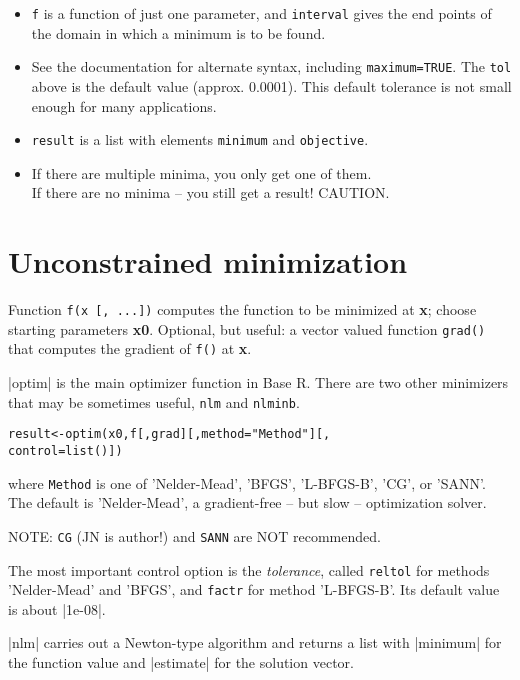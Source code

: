 \documentclass[11pt,a4paper,onecolumn,oneside]{extarticle}
\begin{document}
\begin{landscape}
\begin{multicols}{2}
\begin{itemize}
\item
  \texttt{f} is a function of just one parameter, and \texttt{interval}
  gives the end points of the domain in which a minimum is to be found.
\item
  See the documentation for alternate syntax, including \texttt{maximum=TRUE}.
  The \texttt{tol} above is the default value (approx. 0.0001). This default
  tolerance is not small enough for many applications.
\item
  \texttt{result} is a list with elements \texttt{minimum} and
  \texttt{objective}.
\item
  If there are multiple minima, you only get one of them.\\
  If there are no minima -- you still get a result! CAUTION.
\end{itemize}


\section*{\color{darkred} Unconstrained minimization}

Function \texttt{f(x [, ...])} computes the function to be minimized at 
\textbf{x}; choose starting parameters \textbf{x0}. Optional, but
useful: a vector valued function \texttt{grad()} that computes the gradient
of \texttt{f()} at \textbf{x}.

|optim| is the main optimizer function in Base R. There are two other
minimizers that may be sometimes useful, \verb|nlm| and \verb|nlminb|.

\begin{alltt}
 result <- optim(x0, f [, grad][, method = "Method"][,
                 control = list()])
\end{alltt}
where \texttt{Method} is one of 'Nelder-Mead', 'BFGS', 'L-BFGS-B', 'CG', or 'SANN'.
The default is 'Nelder-Mead', a gradient-free -- but slow -- optimization solver.

NOTE: \texttt{CG} (JN is author!) and \texttt{SANN} are NOT recommended.

The most important control option is the \textit{tolerance}, called 
\texttt{reltol} for methods 'Nelder-Mead' and 'BFGS', and \texttt{factr} 
for method 'L-BFGS-B'. Its default value is about |1e-08|.



|nlm| carries out a Newton-type algorithm and returns a list with |minimum| 
for the function value and |estimate| for the solution vector.


\end{multicols}
\end{landscape}
\end{document}
